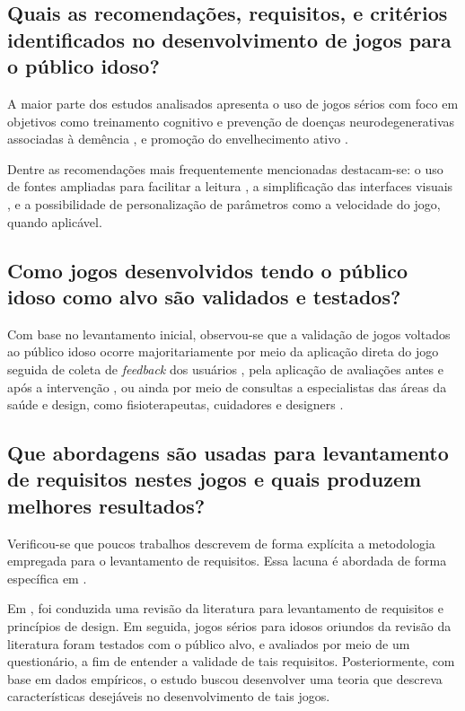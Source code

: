 \subsection{Quais as recomendações, requisitos, e critérios identificados no desenvolvimento de jogos para o público idoso?}\label{subsec:qp1}

A maior parte dos estudos analisados apresenta o uso de jogos sérios com foco em objetivos como treinamento cognitivo e prevenção de doenças neurodegenerativas associadas à demência \cite{yang2024serious, zuo2024development, caggianese2018towards}, e promoção do envelhecimento ativo \cite{nacimiento-garcia2024gamification}.

Dentre as recomendações mais frequentemente mencionadas destacam-se: o uso de fontes ampliadas para facilitar a leitura \cite{tziraki2017designing}, a simplificação das interfaces visuais \cite{valladares2017design}, e a possibilidade de personalização de parâmetros como a velocidade do jogo, quando aplicável.

\subsection{Como jogos desenvolvidos tendo o público idoso como alvo são validados e testados?}\label{subsec:qp2}

Com base no levantamento inicial, observou-se que a validação de jogos voltados ao público idoso ocorre majoritariamente por meio da aplicação direta do jogo seguida de coleta de \textit{feedback} dos usuários \cite{merilampi2017cognitive}, pela aplicação de avaliações antes e após a intervenção \cite{wong2022effectiveness}, ou ainda por meio de consultas a especialistas das áreas da saúde e design, como fisioterapeutas, cuidadores e designers \cite{busca2024serious}.

\subsection{Que abordagens são usadas para levantamento de requisitos nestes jogos e quais produzem melhores resultados?}\label{subsec:qp3}

Verificou-se que poucos trabalhos descrevem de forma explícita a metodologia empregada para o levantamento de requisitos. Essa lacuna é abordada de forma específica em \cite{machado2018heuristics, manser2021making}.

Em \cite{machado2018heuristics}, foi conduzida uma revisão da literatura para levantamento de requisitos e princípios de design. Em seguida, jogos sérios para idosos oriundos da revisão da literatura foram testados com o público alvo, e avaliados por meio de um questionário, a fim de entender a validade de tais requisitos. Posteriormente, com base em dados empíricos, o estudo buscou desenvolver uma teoria que descreva características desejáveis no desenvolvimento de tais jogos.

